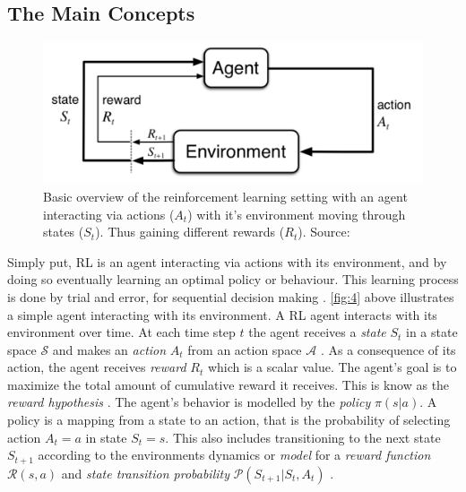 \documentclass{kththesis}
\theoremstyle{definition}
\begin{document}
\subsection{The Main Concepts}
\begin{figure}[H]
    \centering
    \includegraphics[scale=1]{basicRL.png}
    \caption{Basic overview of the reinforcement learning setting with an agent interacting via actions ($A_t$) with it's environment moving through states ($S_t$). Thus gaining different rewards ($R_t$). Source: \textcite{sutton1998reinforcement} }
    \label{fig:4}
\end{figure}

Simply put, RL is an agent interacting via actions with its environment, and by doing so eventually learning an optimal policy or behaviour. This learning process is done by trial and error, for sequential decision making \parencite{li2017deep}. \autoref{fig:4} above illustrates a simple agent interacting with its environment. A RL agent interacts with its environment over time. At each time step $t$ the agent receives  a \textit{state} $S_t$ in a state space $\mathcal{S}$ and makes an \textit{action} $A_t$ from an action space $\mathcal{A}$ \parencite{li2017deep}. As a consequence of its action, the agent receives \textit{reward} $R_t$ which is a scalar value. 
\newline
\newline
The agent's goal is to maximize the total amount of cumulative reward it receives. This is know as the \textit{reward hypothesis} \parencite{sutton1998reinforcement}. The agent's behavior is modelled by the \textit{policy} $\pi(s|a)$. A policy is a mapping from a state to an action, that is the probability of selecting action $A_t=a$ in state $S_t = s$. This also includes transitioning to the next state $S_{t+1}$ according to the environments dynamics or \textit{model} for a \textit{reward function} $\mathcal{R}(s,a)$ and \textit{state transition probability} $\mathcal{P}(S_{t+1} |S_t, A_t)$ \parencite{li2017deep}.
\end{document}
